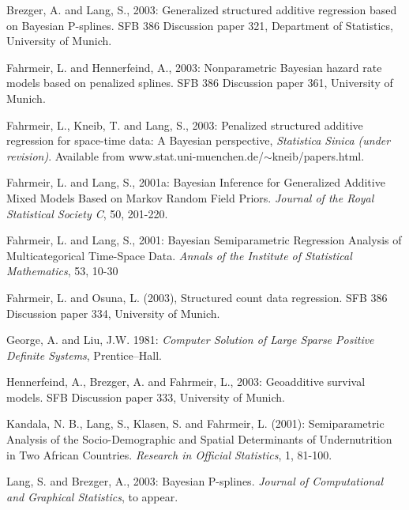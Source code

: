 \documentclass{article}
\begin{document}
\begin{thebibliography}{99}
 Brezger, A. and
Lang, S., 2003: Generalized structured additive regression based
on Bayesian P-splines. SFB 386 Discussion paper 321, Department of
Statistics, University of Munich.

 Fahrmeir,
L. and Hennerfeind, A., 2003: Nonparametric Bayesian hazard rate
models based on penalized splines. SFB 386 Discussion paper 361,
University of Munich.

 Fahrmeir, L., Kneib,
T. and Lang, S., 2003: Penalized structured additive regression
for space-time data: A Bayesian perspective, {\it Statistica
Sinica (under revision)}. Available from
www.stat.uni-muenchen.de/$\sim$kneib/papers.html.

 Fahrmeir, L. and
Lang, S., 2001a: Bayesian Inference for Generalized Additive Mixed
Models Based on Markov Random Field Priors. {\it Journal of the
Royal Statistical Society C}, 50, 201-220.

 Fahrmeir, L. and
Lang, S., 2001: Bayesian Semiparametric Regression Analysis of
Multicategorical Time-Space Data. {\it Annals of the Institute of
Statistical Mathematics}, 53, 10-30

 Fahrmeir, L. and
Osuna, L. (2003), Structured count data regression. SFB 386
Discussion paper 334, University of Munich.

 George, A. and Liu,
J.W. 1981: {\it Computer Solution of Large Sparse Positive
Definite Systems}, Prentice--Hall.

 Hennerfeind, A.,
Brezger, A. and Fahrmeir, L., 2003: Geoadditive survival models.
SFB Discussion paper 333, University of Munich.

 Kandala, N. B., Lang,
S., Klasen, S. and Fahrmeir, L. (2001): Semiparametric Analysis of
the Socio-Demographic and Spatial Determinants of Undernutrition
in Two African Countries. {\it Research in Official Statistics},
1, 81-100.

 Lang, S. and
Brezger, A., 2003: Bayesian P-splines. {\it Journal of
Computational and Graphical Statistics}, to appear.

\end{thebibliography}
\end{document}
